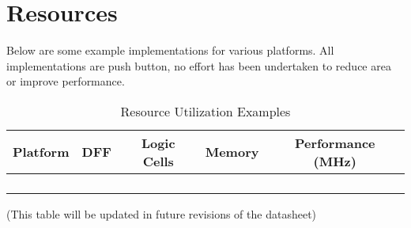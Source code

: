\chapter{Resources} \label{resources}

Below are some example implementations for various platforms. All implementations are push button, no effort has been undertaken to reduce area or improve performance.


\setlength\LTleft{0pt}
\setlength\LTright{0pt}

\begin{longtable}[]{@{\extracolsep{\fill}}lcccc@{}}
\toprule
Platform & DFF & Logic Cells & Memory & Performance (MHz)\tabularnewline
\midrule
\endhead
& & & &\tabularnewline
& & & &\tabularnewline
& & & &\tabularnewline
\bottomrule
\caption{Resource Utilization Examples}
\end{longtable}

(This table will be updated in future revisions of the datasheet)
